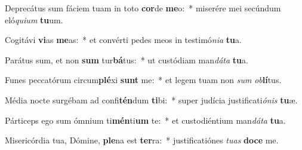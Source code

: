 \item Deprecátus sum fáciem tuam in toto \textbf{cor}de \textbf{me}o:~* miserére mei secúndum eló\textit{qui}\textit{um} \textbf{tu}um.
\item Cogitávi \textbf{vi}as \textbf{me}as:~* et convérti pedes meos in testimó\textit{ni}\textit{a} \textbf{tu}a.
\item Parátus sum, et non \textbf{sum} tur\textbf{bá}tus:~* ut custódiam man\textit{dá}\textit{ta} \textbf{tu}a.
\item Funes peccatórum circum\textbf{plé}xi \textbf{sunt} me:~* et legem tuam non \textit{sum} \textit{ob}\textbf{lí}tus.
\item Média nocte surgébam ad confi\textbf{tén}dum \textbf{ti}bi:~* super judícia justificati\textit{ó}\textit{nis} \textbf{tu}æ.
\item Párticeps ego sum ómnium ti\textbf{mén}ti\textbf{um} te:~* et custodiéntium man\textit{dá}\textit{ta} \textbf{tu}a.
\item Misericórdia tua, Dómine, \textbf{ple}na est \textbf{ter}ra:~* justificatiónes \textit{tu}\textit{as} \textbf{do}\textbf{ce} me.
